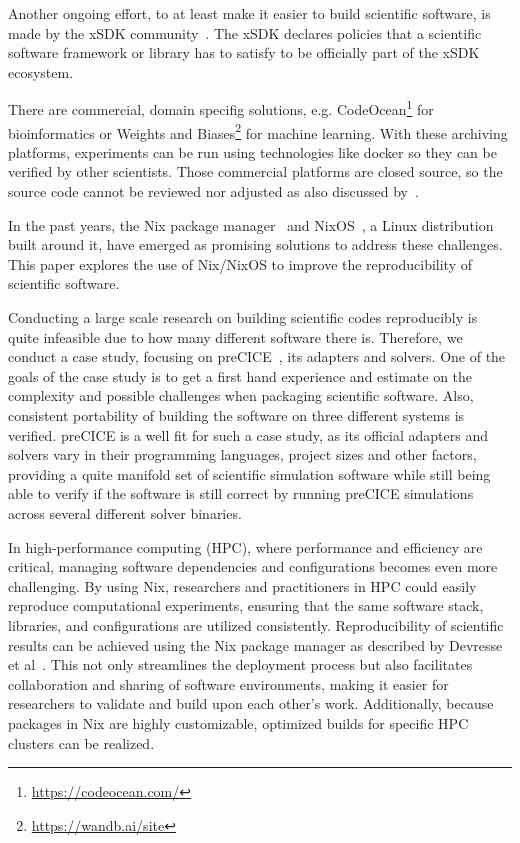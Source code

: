 \documentclass{eceasst}
\begin{document}
Another ongoing effort, to at least make it easier to build scientific software, is made by the xSDK community~\cite{xSDK2023}.
The xSDK declares policies that a scientific software framework or library has to satisfy to be officially part of the xSDK ecosystem.

There are commercial, domain specifig solutions, e.g. CodeOcean\footnote{\url{https://codeocean.com/}} for bioinformatics or Weights and Biases\footnote{\url{https://wandb.ai/site}} for machine learning.
With these archiving platforms, experiments can be run using technologies like docker so they can be verified by other scientists.
Those commercial platforms are closed source, so the source code cannot be reviewed nor adjusted as also discussed by~\cite{koch2023sustainable}.

In the past years, the Nix package manager~\cite{Dolstra_2004} and NixOS~\cite{Dolstra_2010}, a Linux distribution built around it, have emerged as promising solutions to address these challenges.
This paper explores the use of Nix/NixOS to improve the reproducibility of scientific software.

Conducting a large scale research on building scientific codes reproducibly is quite infeasible due to how many different software there is.
Therefore, we conduct a case study, focusing on preCICE~\cite{preCICEv2}, its adapters and solvers.
One of the goals of the case study is to get a first hand experience and estimate on the complexity and possible challenges when packaging scientific software.
Also, consistent portability of building the software on three different systems is verified.
preCICE is a well fit for such a case study, as its official adapters and solvers vary in their programming languages, project sizes and other factors, providing a quite manifold set of scientific simulation software while still being able to verify if the software is still correct by running preCICE simulations across several different solver binaries.

In high-performance computing (HPC), where performance and efficiency are critical, managing software dependencies and configurations becomes even more challenging.
By using Nix, researchers and practitioners in HPC could easily reproduce computational experiments, ensuring that the same software stack, libraries, and configurations are utilized consistently.
Reproducibility of scientific results can be achieved using the Nix package manager as described by Devresse et al~\cite{Devresse_2015}.
This not only streamlines the deployment process but also facilitates collaboration and sharing of software environments, making it easier for researchers to validate and build upon each other's work.
Additionally, because packages in Nix are highly customizable, optimized builds for specific HPC clusters can be realized.
\end{document}
